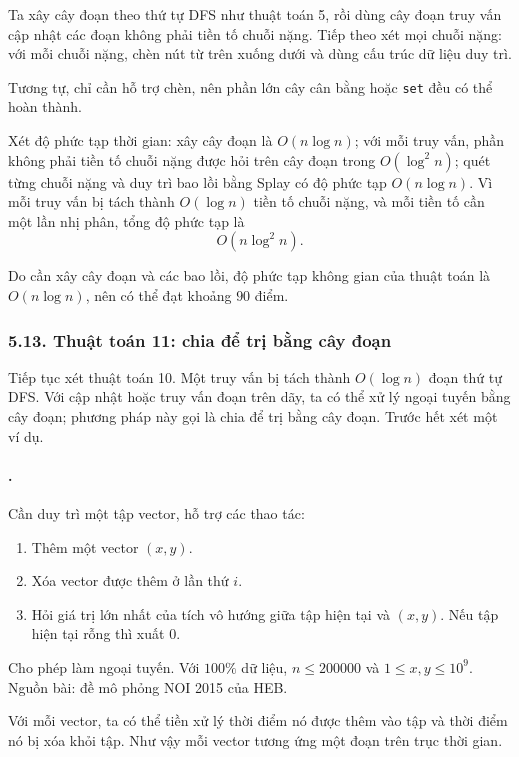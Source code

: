 \documentclass[11pt]{article}
\begin{document}
Ta xây cây đoạn theo thứ tự DFS như thuật toán 5, rồi dùng cây đoạn truy vấn
cập nhật các đoạn không phải tiền tố chuỗi nặng. Tiếp theo xét mọi chuỗi nặng:
với mỗi chuỗi nặng, chèn nút từ trên xuống dưới và dùng cấu trúc dữ liệu duy
trì.

Tương tự, chỉ cần hỗ trợ chèn, nên phần lớn cây cân bằng hoặc \texttt{set} đều
có thể hoàn thành.

Xét độ phức tạp thời gian: xây cây đoạn là \(O(n\log n)\); với mỗi truy vấn,
phần không phải tiền tố chuỗi nặng được hỏi trên cây đoạn trong
\(O(\log^2 n)\); quét từng chuỗi nặng và duy trì bao lồi bằng Splay có độ phức
tạp \(O(n\log n)\). Vì mỗi truy vấn bị tách thành \(O(\log n)\) tiền tố chuỗi
nặng, và mỗi tiền tố cần một lần nhị phân, tổng độ phức tạp là
\[
  O(n\log^2 n).
\]

Do cần xây cây đoạn và các bao lồi, độ phức tạp không gian của thuật toán là
\(O(n\log n)\), nên có thể đạt khoảng \(90\) điểm.

\subsubsection*{5.13. Thuật toán 11: chia để trị bằng cây đoạn}

Tiếp tục xét thuật toán 10. Một truy vấn bị tách thành \(O(\log n)\) đoạn thứ
tự DFS. Với cập nhật hoặc truy vấn đoạn trên dãy, ta có thể xử lý ngoại tuyến
bằng cây đoạn; phương pháp này gọi là chia để trị bằng cây đoạn. Trước hết xét
một ví dụ.

\paragraph{.}
Cần duy trì một tập vector, hỗ trợ các thao tác:
\begin{enumerate}
  \item Thêm một vector \((x,y)\).
  \item Xóa vector được thêm ở lần thứ \(i\).
  \item Hỏi giá trị lớn nhất của tích vô hướng giữa tập hiện tại và \((x,y)\).
  Nếu tập hiện tại rỗng thì xuất \(0\).
\end{enumerate}
Cho phép làm ngoại tuyến. Với \(100\%\) dữ liệu, \(n\le 200000\) và
\(1\le x,y\le 10^9\). Nguồn bài: đề mô phỏng NOI 2015 của HEB.

Với mỗi vector, ta có thể tiền xử lý thời điểm nó được thêm vào tập và thời
điểm nó bị xóa khỏi tập. Như vậy mỗi vector tương ứng một đoạn trên trục thời
gian.
\end{document}
